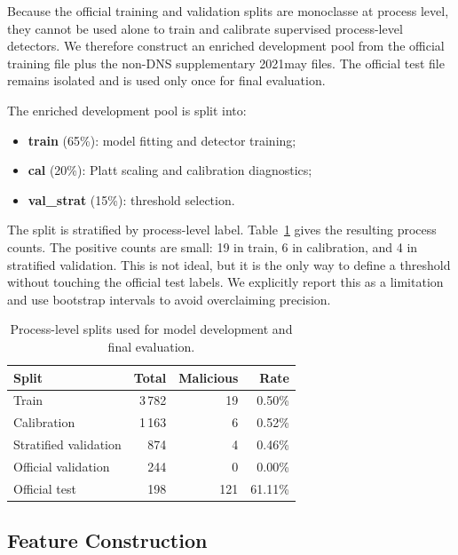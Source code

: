 \documentclass[10pt,journal,compsoc]{IEEEtran}
\begin{document}
Because the official training and validation splits are monoclasse at process level, they cannot be used alone to train and calibrate supervised process-level detectors. We therefore construct an enriched development pool from the official training file plus the non-DNS supplementary 2021may files. The official test file remains isolated and is used only once for final evaluation.

The enriched development pool is split into:
\begin{itemize}
    \item \textbf{train} (65\%): model fitting and detector training;
    \item \textbf{cal} (20\%): Platt scaling and calibration diagnostics;
    \item \textbf{val\_strat} (15\%): threshold selection.
\end{itemize}
The split is stratified by process-level label. Table~\ref{tab:splits_new} gives the resulting process counts. The positive counts are small: 19 in train, 6 in calibration, and 4 in stratified validation. This is not ideal, but it is the only way to define a threshold without touching the official test labels. We explicitly report this as a limitation and use bootstrap intervals to avoid overclaiming precision.

\begin{table}[t]
\centering
\caption{Process-level splits used for model development and final evaluation.}
\label{tab:splits_new}
\begin{tabular}{lrrr}
\toprule
\textbf{Split} & \textbf{Total} & \textbf{Malicious} & \textbf{Rate} \\
\midrule
Train & 3\,782 & 19 & 0.50\% \\
Calibration & 1\,163 & 6 & 0.52\% \\
Stratified validation & 874 & 4 & 0.46\% \\
Official validation & 244 & 0 & 0.00\% \\
Official test & 198 & 121 & 61.11\% \\
\bottomrule
\end{tabular}
\end{table}

\subsection{Feature Construction}
\end{document}

